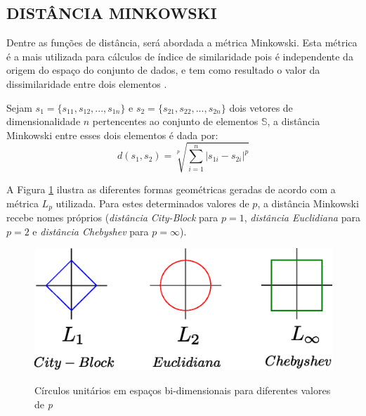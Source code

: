 \subsection{DISTÂNCIA MINKOWSKI}
Dentre as funções de distância, será abordada a métrica Minkowski. Esta métrica é a mais utilizada para cálculos de índice de similaridade
pois é independente da origem do espaço do conjunto de dados, e tem como resultado o valor da dissimilaridade entre dois elementos \cite{Jain1988}.
\begin{mydef}
\label{def:mink}
  Sejam $s_1 = \{s_{11},s_{12},...,s_{1n}\}$ e $s_2 = \{s_{21},s_{22},...,s_{2n}\}$ dois vetores de dimensionalidade $n$ pertencentes ao conjunto de
  elementos $\mathbb{S}$, a distância Minkowski entre esses dois elementos é dada por:
\begin{equation}
		d(s_1,s_2) = \sqrt[p]{\sum_{i=1}^{n}|s_{1i} - s_{2i}|^p}
\end{equation}
\end{mydef}

A Figura \ref{fig:minko} ilustra as diferentes formas geométricas geradas de acordo com a métrica $L_p$ utilizada. Para estes determinados valores de $p$, a distância Minkowski recebe nomes
próprios (\textit{distância City-Block} para $p = 1$, \textit{distância Euclidiana} para $p = 2$ e \textit{distância Chebyshev} para $p = \infty$).

\begin{figure}[H]
\centering
\caption{Círculos unitários em espaços bi-dimensionais para diferentes valores de \textit{p}}
\includegraphics[width=.55\textwidth]{dados/figuras/minko.eps}
\label{fig:minko}
\end{figure}

